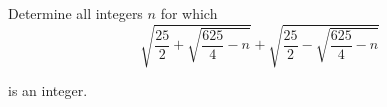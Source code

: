 Determine all integers $n$ for which\[\sqrt{\frac{25}{2}+\sqrt{\frac{625}{4}-n}}+\sqrt{\frac{25}{2}-\sqrt{\frac{625}{4}-n}}\]

is an integer.